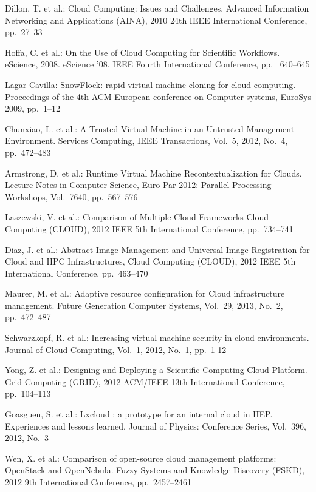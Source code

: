 \documentclass{cai}
\begin{document}
\begin{thebibliography}{99}

Dillon, T. et al.: Cloud Computing: Issues and Challenges.
Advanced Information Networking and Applications (AINA), 2010 24th IEEE International Conference, pp.~27--33

Hoffa, C. et al.: On the Use of Cloud Computing for Scientific Workflows.
eScience, 2008. eScience '08. IEEE Fourth International Conference, pp. ~640--645

Lagar-Cavilla: SnowFlock: rapid virtual machine cloning for cloud computing.
Proceedings of the 4th ACM European conference on Computer systems, EuroSys 2009, pp.~1--12

Chunxiao, L. et al.: A Trusted Virtual Machine in an Untrusted Management Environment.
Services Computing, IEEE Transactions, 
Vol.~5, 2012, No.~4, pp.~472--483

Armstrong, D. et al.: Runtime Virtual Machine Recontextualization for Clouds.
Lecture Notes in Computer Science, Euro-Par 2012: Parallel Processing Workshops, 
Vol.~7640, pp.~567--576

Laszewski, V. et al.: Comparison of Multiple Cloud Frameworks
Cloud Computing (CLOUD), 2012 IEEE 5th International Conference, pp.~734--741

Diaz, J. et al.: Abstract Image Management and Universal Image Registration for Cloud and HPC Infrastructures,
Cloud Computing (CLOUD), 2012 IEEE 5th International Conference, pp.~463--470

Maurer, M. et al.: Adaptive resource configuration for Cloud infrastructure management.
Future Generation Computer Systems,
Vol.~29, 2013, No.~2, pp.~472--487

Schwarzkopf, R. et al.: Increasing virtual machine security in cloud environments.
Journal of Cloud Computing,
Vol.~1, 2012, No.~1, pp.~1-12

Yong, Z. et al.: Designing and Deploying a Scientific Computing Cloud Platform.
Grid Computing (GRID), 2012 ACM/IEEE 13th International Conference, pp.~104--113

Goasguen, S. et al.: Lxcloud : a prototype for an internal cloud in HEP. Experiences and lessons learned.
Journal of Physics: Conference Series,
Vol.~396, 2012, No.~3

Wen, X. et al.: Comparison of open-source cloud management platforms: OpenStack and OpenNebula.
Fuzzy Systems and Knowledge Discovery (FSKD), 2012 9th International Conference, pp.~2457--2461



\end{thebibliography}
\end{document}
